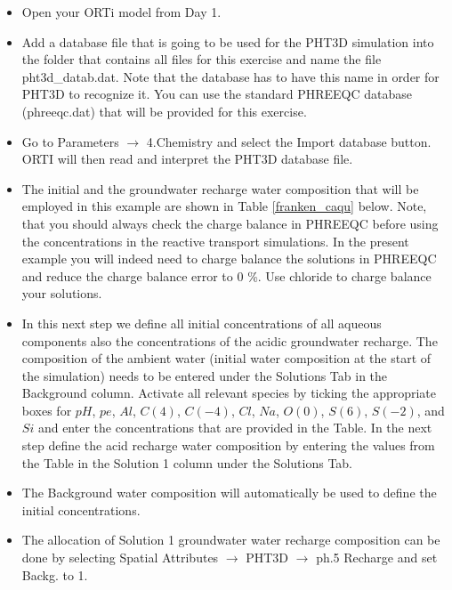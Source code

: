 \begin{itemize}

\item Open your ORTi model from Day 1. 

\item Add a database file that is going to be used for the PHT3D simulation into the folder that contains all files for this exercise and name the file {\color{blue}pht3d\_datab.dat}. Note that the database has to have this name in order for PHT3D to recognize it. You can use the standard PHREEQC database (phreeqc.dat) that will be provided for this exercise. 

\item Go to {\color{blue}Parameters} $\rightarrow$ {\color{blue}4.Chemistry} and select the
{\color{blue}Import database} button. ORTI will then read and interpret 
the PHT3D database file.

\item The initial and the groundwater recharge water composition that will be employed in this example are shown in Table \ref{franken_caqu} below. Note, that you should always check the charge balance in PHREEQC before using the concentrations in the reactive transport simulations. In the present example you will indeed need to charge balance the solutions in PHREEQC and reduce the charge balance error to 0 \%. Use chloride to charge balance your solutions.

\item In this next step we define all initial concentrations of all aqueous components
also the concentrations of the acidic groundwater recharge. The composition of the ambient water (initial water composition at the start of the simulation) 
needs to be entered under the {\color{blue}Solutions} Tab in the {\color{blue}Background} column.
Activate all relevant species by ticking the appropriate boxes for 
$pH$, $pe$,  $Al$, $C(4)$,  $C(-4)$, $Cl$, $Na$, $O(0)$, $S(6)$, $S(-2)$, and $Si$
and enter the concentrations that are provided in the Table. In the next step define the acid 
recharge water composition by entering the values from the Table in the {\color{blue}Solution 1} column 
under the {\color{blue}Solutions} Tab.  

\item The {\color{blue}Background} water composition will automatically be used to define the 
initial concentrations.

\item The allocation of {\color{blue}Solution 1} groundwater water recharge composition can be
done by selecting 
{\color{blue}Spatial Attributes} $\rightarrow$ 
{\color{blue}PHT3D} $\rightarrow$ 
{\color{blue} ph.5 Recharge} and set {\color{blue}Backg.} to 1.  

\end{itemize}

